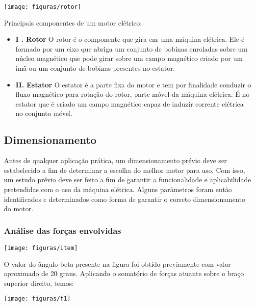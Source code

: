                         \begin{center}
    	\texttt{[image: figuras/rotor]}
        \label{rotor}
    \end{center}


Principais componentes de um motor elétrico:
     \begin{itemize}
     \item \textbf{I . Rotor} O rotor é o componente que gira em uma máquina elétrica. Ele é formado por um eixo que abriga um conjunto de bobinas enroladas sobre um núcleo magnético que pode girar sobre um campo magnético criado por um imã ou um conjunto de bobinas presentes no estator.
     \item \textbf{II. Estator} O estator é a parte fixa do motor e tem por finalidade conduzir o fluxo magnético para rotação do rotor, parte móvel da máquina elétrica. É no estator que é criado um campo magnético capaz de induzir corrente elétrica no conjunto móvel.
    \end{itemize}

\subsection{Dimensionamento}

Antes de qualquer aplicação prática, um dimensionamento prévio deve ser estabelecido a fim de determinar a escolha do melhor motor para uso. Com isso, um estudo prévio deve ser feito a fim de garantir a funcionalidade e aplicabilidade pretendidas com o uso da máquina elétrica. Alguns parâmetros foram então identificados e determinados como forma de garantir o correto dimensionamento do motor.

\subsubsection{Análise das forças envolvidas}

 \begin{center}
    	\texttt{[image: figuras/item]}
        \label{item}
    \end{center}

O valor do ângulo beta presente na figura foi obtido previamente com valor aproximado de 20 graus. Aplicando o somatório de forças atuante sobre o braço superior direito, temos:
              \begin{center}
    	\texttt{[image: figuras/f1]}
                \label{f1}
    \end{center}

